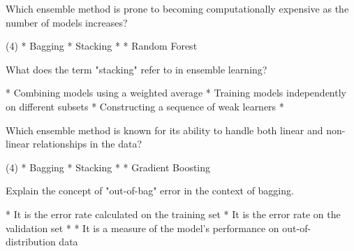 \documentclass[11pt]{extarticle}
\begin{document}
\begin{exercise}
    Which ensemble method is prone to becoming computationally expensive as the number of models increases?
    \begin{choice} (4)
        * Bagging
        * Stacking
        * 
        * Random Forest
    \end{choice}
\end{exercise}
\begin{solution}
\end{solution}

\begin{exercise}
    What does the term "stacking" refer to in ensemble learning?
    \begin{choice}
        * Combining models using a weighted average
        * Training models independently on different subsets
        * Constructing a sequence of weak learners
        * 
    \end{choice}
\end{exercise}
\begin{solution}
\end{solution}

\begin{exercise}
    Which ensemble method is known for its ability to handle both linear and non-linear relationships in the data?
    \begin{choice}(4)
        * Bagging
        * Stacking
        * 
        * Gradient Boosting
    \end{choice}
\end{exercise}
\begin{solution}
\end{solution}

\begin{exercise}
    Explain the concept of "out-of-bag" error in the context of bagging.
    \begin{choice}
        * It is the error rate calculated on the training set
        * It is the error rate on the validation set
        * 
        * It is a measure of the model's performance on out-of-distribution data
    \end{choice}
\end{exercise}
\begin{solution}
\end{solution}
\end{document}
